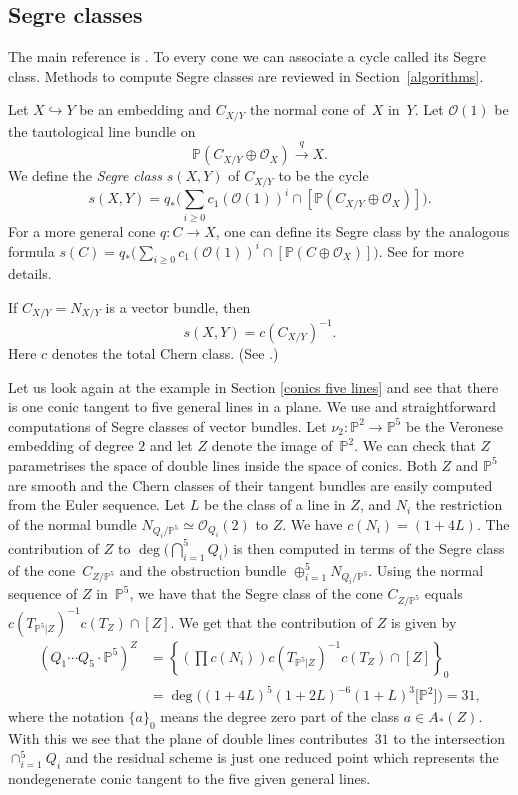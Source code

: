 \documentclass[pdftex]{sigma}
\numberwithin{equation}{section}
\newcommand{\PP}{\mathbb P}
\theoremstyle{plain}
\theoremstyle{definition}
\theoremstyle{remark}
\begin{document}
\subsection{Segre classes}
The main reference is \cite[Chapter~4]{Fulton}. To every cone we can associate a cycle called its Segre class. Methods to compute Segre classes are reviewed in Section~\ref{algorithms}.
\begin{Definition}
Let $X\hookrightarrow Y$ be an embedding and $C_{X/Y}$ the normal cone of~$X$ in~$Y$. Let $\mathcal O(1)$ be the tautological line bundle on
\[\PP(C_{X/Y}\oplus \mathcal O_X)\stackrel{q}{\longrightarrow}X.
\]
We define the \emph{Segre class} $s(X,Y)$ of $C_{X/Y}$ to be the cycle
\[
s(X,Y)=q_*\bigg(\sum_{i\geq 0}c_1(\mathcal O(1))^i\cap[\PP(C_{X/Y}\oplus \mathcal O_X)]\bigg).
\]
For a more general cone $q\colon C\to X$, one can define its Segre class by the analogous formula $s(C)=q_*\big(\sum_{i\geq 0}c_1(\mathcal O(1))^i\cap[\PP(C\oplus \mathcal O_X)]\big)$. See \cite[Chapter~4]{Fulton} for more details.
\end{Definition}
\begin{Example}\label{ex:s=cinv} If $C_{X/Y}=N_{X/Y}$ is a vector bundle, then
\[s(X,Y)=c(C_{X/Y})^{-1}.\]
Here $c$ denotes the total Chern class. (See \cite[Proposition~4.1]{Fulton}.)
\end{Example}
\begin{Example}\label{conics lines revised}
Let us look again at the example in Section \ref{conics five lines} and see that there is one conic tangent to five general lines in a plane. We use \cite[Proposition~9.1.1]{Fulton} and straightforward computations of Segre classes of vector bundles. Let $\nu_2\colon\mathbb P^2\to\mathbb P^5$ be the Veronese embedding of degree $2$ and let $Z$ denote the image of~$\mathbb P^2$. We can check that $Z$ parametrises the space of double lines inside the space of conics. Both $Z$ and $\PP^5$ are smooth and the Chern classes of their tangent bundles are easily computed from the Euler sequence. Let $L$ be the class of a line in $Z$, and $N_i$ the restriction of the normal bundle $N_{Q_i/\mathbb P^5}\simeq\mathcal O_{Q_i}(2)$ to $Z$. We have $c(N_i)=(1+4L)$. The contribution of $Z$ to $\deg\big(\bigcap_{i=1}^5 Q_i\big)$ is then computed in terms of the Segre class of the cone~$C_{Z/\PP^5}$ and the obstruction bundle $\oplus_{i=1}^5N_{Q_i/\mathbb P^5}$. Using the normal sequence of $Z$ in~$\PP^5$, we have that the Segre class of the cone $C_{Z/\PP^5}$ equals $c(T_{\mathbb P^5|Z})^{-1} c(T_Z)\cap [Z]$. We get that the contribution of $Z$ is given by
\begin{align*}
 (Q_1\cdots Q_5\cdot\mathbb P^5)^Z& =\left\{ \left(\prod c(N_i)\right) c(T_{\mathbb P^5|Z})^{-1} c(T_Z)\cap [Z]\right\}_0\\& =\deg\big((1+4L)^5(1+2L)^{-6}(1+L)^3\big[\mathbb P^2\big]\big) =31,
\end{align*}
where the notation $\{a\}_0$ means the degree zero part of the class $a\in A_*(Z)$. With this we see that the plane of double lines contributes~$31$ to the intersection $\cap_{i=1}^5Q_i$ and the residual scheme is just one reduced point which represents the nondegenerate conic tangent to the five given general lines.
\end{Example}
\end{document}
